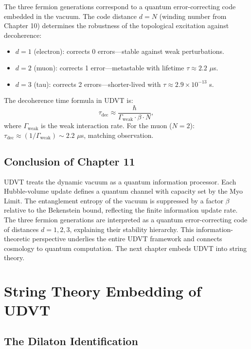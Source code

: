 \documentclass[12pt,a4paper]{book}
\theoremstyle{definition}
\theoremstyle{remark}
\begin{document}
The three fermion generations correspond to a quantum error-correcting code embedded in the vacuum. The code distance $d = N$ (winding number from Chapter 10) determines the robustness of the topological excitation against decoherence:
\begin{itemize}
    \item $d = 1$ (electron): corrects 0 errors---stable against weak perturbations.
    \item $d = 2$ (muon): corrects 1 error---metastable with lifetime $\tau \approx 2.2$ $\mu$s.
    \item $d = 3$ (tau): corrects 2 errors---shorter-lived with $\tau \approx 2.9 \times 10^{-13}$ s.
\end{itemize}
The decoherence time formula in UDVT is:
\begin{equation}
    \tau_{\mathrm{dec}} \approx \frac{\hbar}{\Gamma_{\mathrm{weak}} \cdot \beta \cdot N},
\end{equation}
where $\Gamma_{\mathrm{weak}}$ is the weak interaction rate. For the muon ($N = 2$): $\tau_{\mathrm{dec}} \approx (1/\Gamma_{\mathrm{weak}}) \sim 2.2$ $\mu$s, matching observation.

\section{Conclusion of Chapter 11}

UDVT treats the dynamic vacuum as a quantum information processor. Each Hubble-volume update defines a quantum channel with capacity set by the Myo Limit. The entanglement entropy of the vacuum is suppressed by a factor $\beta$ relative to the Bekenstein bound, reflecting the finite information update rate. The three fermion generations are interpreted as a quantum error-correcting code of distances $d = 1, 2, 3$, explaining their stability hierarchy. This information-theoretic perspective underlies the entire UDVT framework and connects cosmology to quantum computation. The next chapter embeds UDVT into string theory.

\chapter{String Theory Embedding of UDVT}
\label{ch:string}

\section{The Dilaton Identification}
\end{document}
